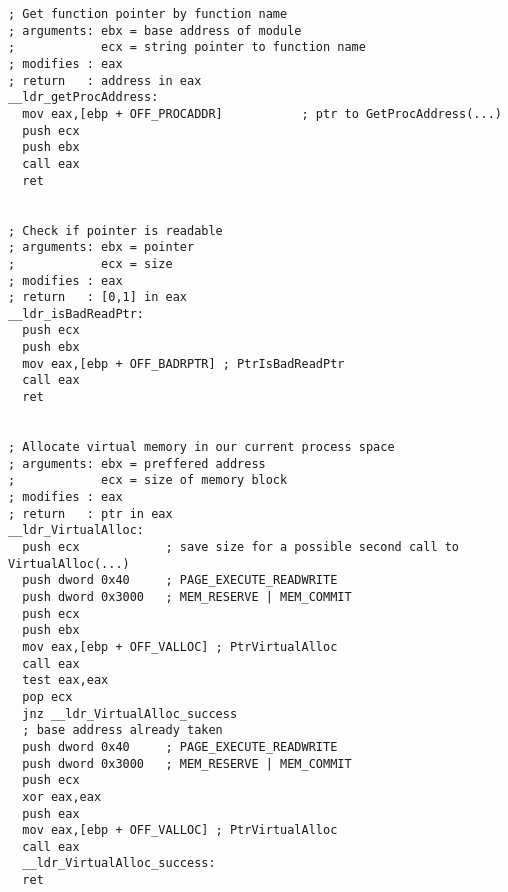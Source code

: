 \documentclass{article}
\begin{document}
\begin{lstlisting}[frame=single]
; Get function pointer by function name
; arguments: ebx = base address of module
;            ecx = string pointer to function name
; modifies : eax
; return   : address in eax
__ldr_getProcAddress:
  mov eax,[ebp + OFF_PROCADDR]           ; ptr to GetProcAddress(...)
  push ecx
  push ebx
  call eax
  ret


; Check if pointer is readable
; arguments: ebx = pointer
;            ecx = size
; modifies : eax
; return   : [0,1] in eax
__ldr_isBadReadPtr:
  push ecx
  push ebx
  mov eax,[ebp + OFF_BADRPTR] ; PtrIsBadReadPtr
  call eax
  ret


; Allocate virtual memory in our current process space
; arguments: ebx = preffered address
;            ecx = size of memory block
; modifies : eax
; return   : ptr in eax
__ldr_VirtualAlloc:
  push ecx            ; save size for a possible second call to VirtualAlloc(...)
  push dword 0x40     ; PAGE_EXECUTE_READWRITE
  push dword 0x3000   ; MEM_RESERVE | MEM_COMMIT
  push ecx
  push ebx
  mov eax,[ebp + OFF_VALLOC] ; PtrVirtualAlloc
  call eax
  test eax,eax
  pop ecx
  jnz __ldr_VirtualAlloc_success
  ; base address already taken
  push dword 0x40     ; PAGE_EXECUTE_READWRITE
  push dword 0x3000   ; MEM_RESERVE | MEM_COMMIT
  push ecx
  xor eax,eax
  push eax
  mov eax,[ebp + OFF_VALLOC] ; PtrVirtualAlloc
  call eax
  __ldr_VirtualAlloc_success:
  ret



\end{lstlisting}
\end{document}
